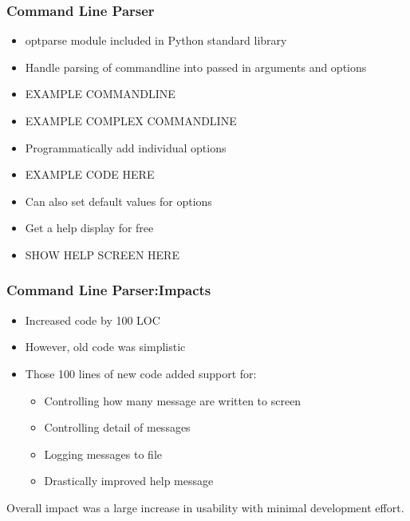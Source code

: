\documentclass[red, hyperref={pdfpagelabels=false}]{beamer}
\begin{document}
\begin{frame}
  \frametitle{Command Line Parser}
  \begin{itemize}
    \item optparse module included in Python standard library
    \item Handle parsing of commandline into passed in arguments and options
    \item EXAMPLE COMMANDLINE
    \item EXAMPLE COMPLEX COMMANDLINE
    \item Programmatically add individual options
    \item EXAMPLE CODE HERE
    \item Can also set default values for options
    \item Get a help display for free
    \item SHOW HELP SCREEN HERE
  \end{itemize}
\end{frame}

\begin{frame}
  \frametitle{Command Line Parser:Impacts}
  \begin{itemize}
    \item Increased code by 100 LOC
    \item However, old code was simplistic
    \item Those 100 lines of new code added support for:
    \begin{itemize}
      \item Controlling how many message are written to screen
      \item Controlling detail of messages
      \item Logging messages to file
      \item Drastically improved help message
    \end{itemize}
  \end{itemize}
  Overall impact was a large increase in usability with minimal development effort.
\end{frame}
\end{document}
